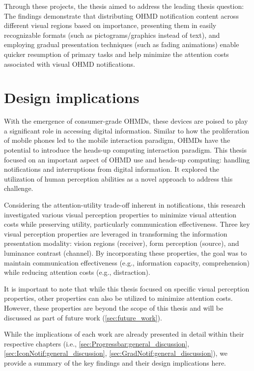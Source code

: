 Through these projects, the thesis aimed to address the leading thesis question: \RQMainThesis{} The findings demonstrate that distributing OHMD notification content across different visual regions based on importance, presenting them in easily recognizable formats (such as pictograms/graphics instead of text), and employing gradual presentation techniques (such as fading animations) enable quicker resumption of primary tasks and help minimize the attention costs associated with visual OHMD notifications.




\section{Design implications}

With the emergence of consumer-grade OHMDs, these devices are poised to play a significant role in accessing digital information. Similar to how the proliferation of mobile phones led to the mobile interaction paradigm, OHMDs have the potential to introduce the heads-up computing interaction paradigm. This thesis focused on an important aspect of OHMD use and heads-up computing: handling notifications and interruptions from digital information. It explored the utilization of human perception abilities as a novel approach to address this challenge.

Considering the attention-utility trade-off inherent in notifications, this research investigated various visual perception properties to minimize visual attention costs while preserving utility, particularly communication effectiveness. Three key visual perception properties are leveraged in transforming the information presentation modality: vision regions (receiver), form perception (source), and luminance contrast (channel). By incorporating these properties, the goal was to maintain communication effectiveness (e.g., information capacity, comprehension) while reducing attention costs (e.g., distraction).

It is important to note that while this thesis focused on specific visual perception properties, other properties can also be utilized to minimize attention costs. However, these properties are beyond the scope of this thesis and will be discussed as part of future work (\autoref{sec:future_work}).

While the implications of each work are already presented in detail within their respective chapters (i.e., \autoref{sec:Progressbar:general_discussion}, \autoref{sec:IconNotif:general_discussion}, \autoref{sec:GradNotif:general_discussion}), we provide a summary of the key findings and their design implications here.

